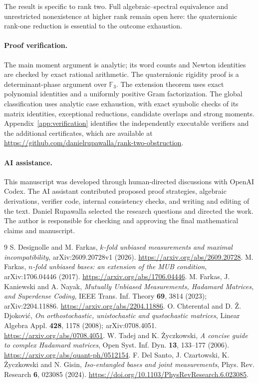 \documentclass[11pt]{article}
\begin{document}
The result is specific to rank two. Full algebraic--spectral equivalence
and unrestricted nonexistence at higher rank remain open here: the
quaternionic rank-one reduction is essential to the outcome exhaustion.

\paragraph{Proof verification.}
The main moment argument is analytic; its word counts and Newton
identities are checked by exact rational arithmetic. The quaternionic
rigidity proof is a determinant-phase argument over $\mathbb F_3$.
The extension theorem uses exact polynomial identities and a uniformly
positive Gram factorization. The global classification uses analytic
case exhaustion, with exact symbolic checks of its matrix identities,
exceptional reductions, candidate overlaps and strong moments. Appendix~\ref{app:verification} identifies
the independently executable verifiers and the additional certificates,
which are available at
\url{https://github.com/danielrupawalla/rank-two-obstruction}.

\paragraph{AI assistance.}
This manuscript was developed through human-directed discussions with
OpenAI Codex. The AI assistant contributed proposed proof strategies,
algebraic derivations, verifier code, internal consistency checks, and
writing and editing of the text. Daniel Rupawalla selected the research
questions and directed the work. The author is responsible for
checking and approving the final mathematical claims and manuscript.

\begin{thebibliography}{9}
 S. Designolle and M. Farkas,
\emph{$k$-fold unbiased measurements and maximal incompatibility},
arXiv:2609.20728v1 (2026).
\url{https://arxiv.org/abs/2609.20728}.
 M. Farkas, \emph{$n$-fold unbiased bases: an extension of the MUB condition},
arXiv:1706.04446 (2017). \url{https://arxiv.org/abs/1706.04446}.
 M. Farkas, J. Kaniewski and A. Nayak,
\emph{Mutually Unbiased Measurements, Hadamard Matrices, and Superdense Coding},
IEEE Trans. Inf. Theory \textbf{69}, 3814 (2023);
arXiv:2204.11886. \url{https://arxiv.org/abs/2204.11886}.
 O. Chterental and D. \v{Z}. Djokovi\'c,
\emph{On orthostochastic, unistochastic and qustochastic matrices},
Linear Algebra Appl. \textbf{428}, 1178 (2008);
arXiv:0708.4051. \url{https://arxiv.org/abs/0708.4051}.
 W. Tadej and K. \.{Z}yczkowski,
\emph{A concise guide to complex Hadamard matrices},
Open Syst. Inf. Dyn. \textbf{13}, 133--177 (2006).
\url{https://arxiv.org/abs/quant-ph/0512154}.
 F. Del Santo, J. Czartowski, K. \.{Z}yczkowski and N. Gisin,
\emph{Iso-entangled bases and joint measurements},
Phys. Rev. Research \textbf{6}, 023085 (2024).
\url{https://doi.org/10.1103/PhysRevResearch.6.023085}.
\end{thebibliography}
\end{document}
